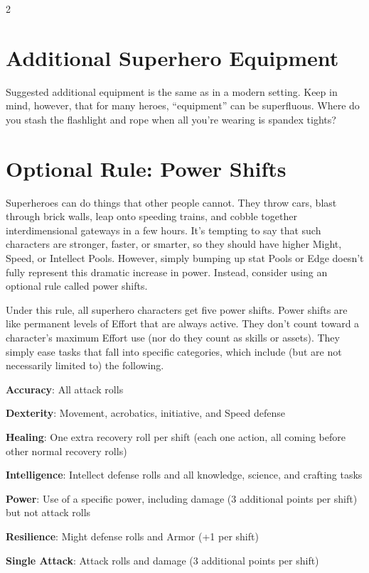 \begin{multicols}{2}

\chapter{Additional Superhero Equipment}

Suggested additional equipment is the same as in a modern setting. Keep in mind, however, that for many heroes, “equipment” can be superfluous. Where do you stash the flashlight and rope when all you’re wearing is spandex tights?

\chapter{Optional Rule: Power Shifts}

Superheroes can do things that other people cannot. They throw cars, blast through brick walls, leap onto speeding trains, and cobble together interdimensional gateways in a few hours. It’s tempting to say that such characters are stronger, faster, or smarter, so they should have higher Might, Speed, or Intellect Pools. However, simply bumping up stat Pools or Edge doesn’t fully represent this dramatic increase in power. Instead, consider using an optional rule called power shifts.

Under this rule, all superhero characters get five power shifts. Power shifts are like permanent levels of Effort that are always active. They don’t count toward a character’s maximum Effort use (nor do they count as skills or assets). They simply ease tasks that fall into specific categories, which include (but are not necessarily limited to) the following.

\textbf{Accuracy}: All attack rolls

\textbf{Dexterity}: Movement, acrobatics, initiative, and Speed defense

\textbf{Healing}: One extra recovery roll per shift (each one action, all coming before other normal recovery rolls)

\textbf{Intelligence}: Intellect defense rolls and all knowledge, science, and crafting tasks

\textbf{Power}: Use of a specific power, including damage (3 additional points per shift) but not attack rolls

\textbf{Resilience}: Might defense rolls and Armor (+1 per shift)

\textbf{Single Attack}: Attack rolls and damage (3 additional points per shift)


\end{multicols}
